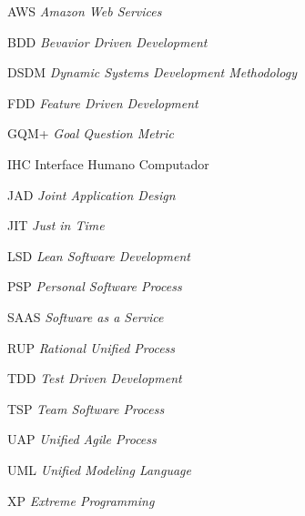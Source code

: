 \begin{siglas} %
  \item[AWS] \textit{Amazon Web Services}
  \item[BDD] \textit{Bevavior Driven Development}
  \item[DSDM] \textit{Dynamic Systems Development Methodology}
  \item[FDD] \textit{Feature Driven Development}
  \item[GQM+] \textit{Goal Question Metric}
  \item[IHC] Interface Humano Computador
  \item[JAD] \textit{Joint Application Design}
  \item[JIT] \textit{Just in Time}
  \item[LSD] \textit{Lean Software Development}
  \item[PSP] \textit{Personal Software Process}
  \item[SAAS] \textit{Software as a Service}
  \item[RUP] \textit{Rational Unified Process}
  \item[TDD] \textit{Test Driven Development}
  \item[TSP] \textit{Team Software Process}
  \item[UAP] \textit{Unified Agile Process} 
  \item[UML] \textit{Unified Modeling Language}
  \item[XP] \textit{Extreme Programming}
\end{siglas}


 
\tableofcontents*
\cleardoublepage



